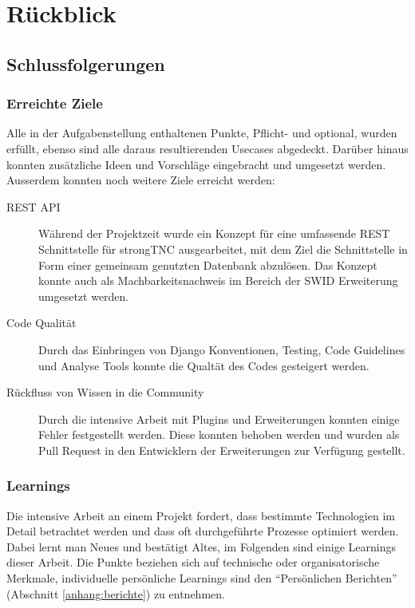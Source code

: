 \chapter{Rückblick}


\section{Schlussfolgerungen}

\subsection{Erreichte Ziele}
Alle in der Aufgabenstellung enthaltenen Punkte, Pflicht- und optional,  wurden
erfüllt, ebenso sind alle daraus resultierenden Usecases abgedeckt. Darüber
hinaus konnten zusätzliche Ideen und Vorschläge eingebracht und umgesetzt
werden.\\
Ausserdem konnten noch weitere Ziele erreicht werden:                 
\begin{description}                  
                                  
	\item[REST API] Während der Projektzeit wurde ein Konzept für eine umfassende
	REST Schnittstelle für strongTNC ausgearbeitet, mit dem Ziel die Schnittstelle
	in Form einer gemeinsam genutzten Datenbank abzulösen. Das Konzept konnte auch
	als Machbarkeitsnachweis im Bereich der SWID Erweiterung umgesetzt werden.
	
	\item[Code Qualität] Durch das Einbringen von Django Konventionen, Testing,
	Code Guidelines und Analyse Tools konnte die Qualtät des Codes gesteigert
	werden.
	
	\item[Rückfluss von Wissen in die Community] Durch die intensive Arbeit mit
	Plugins und Erweiterungen konnten einige Fehler festgestellt werden. Diese
	konnten behoben werden und wurden als Pull Request in den Entwicklern der
	Erweiterungen zur Verfügung gestellt.
	
\end{description}


\subsection{Learnings}
Die intensive Arbeit an einem Projekt fordert, dass bestimmte Technologien im
Detail betrachtet werden und dass oft durchgeführte Prozesse optimiert werden.
Dabei lernt man Neues und bestätigt Altes, im Folgenden sind einige Learnings
dieser Arbeit. Die Punkte beziehen sich auf technische oder organisatorische
Merkmale, individuelle persönliche Learnings sind den \enquote{Persönlichen
Berichten} (Abschnitt \ref{anhang:berichte}) zu entnehmen.


